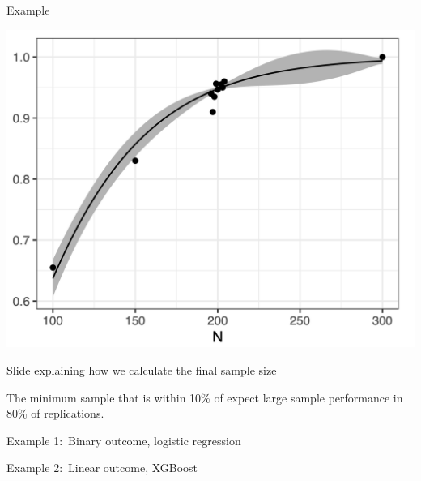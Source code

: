 \documentclass[11pt]{beamer}
\begin{document}
\begin{frame}[c]{Example}

    \includegraphics[width=\textwidth]{figures/mlpwr_example.png}

\end{frame}

\begin{frame}[t]{Slide explaining how we calculate the final sample size}

    The minimum sample that is within 10\% of expect large sample performance
    in 80\% of replications.

\end{frame}

\begin{frame}[t]{Example 1:\ Binary outcome, logistic regression }

\end{frame}

\begin{frame}[t]{Example 2:\ Linear outcome, XGBoost}

\end{frame}

\end{document}
